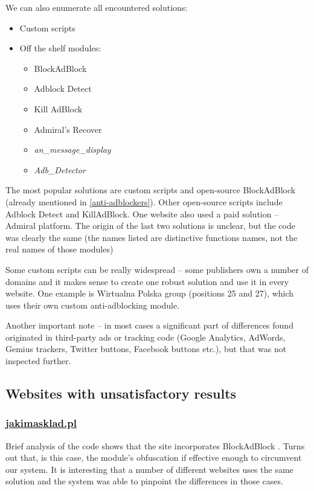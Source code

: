 We can also enumerate all encountered solutions:
\begin{itemize}
  \item Custom scripts
  \item Off the shelf modules:
    \begin{itemize}
      \item BlockAdBlock \cite{github:blockadblock}
      \item Adblock Detect \cite{adblock-detect}
      \item Kill AdBlock \cite{kill-adblock}
      \item Admiral's Recover \cite{admiral:recover}
      \item \emph{an\_message\_display}
      \item \emph{Adb\_Detector}
    \end{itemize}
\end{itemize}

The most popular solutions are custom scripts and open-source BlockAdBlock (already mentioned in \ref{anti-adblockers}).
Other open-source scripts include Adblock Detect and KillAdBlock. One website also used a paid solution -- Admiral platform.
The origin of the last two solutions is unclear, but the code was clearly the same (the names listed are 
distinctive functions names, not the real names of those modules)

Some custom scripts can be really widespread -- some publishers own a number of domains and it makes 
sense to create one robust solution and use it in every website. One example is Wirtualna Polska group (positions 25 and 27), 
which uses their own custom anti-adblocking module.

Another important note -- in most cases a significant part of differences found originated in third-party ads
or tracking code (Google Analytics, AdWords, Gemius trackers, Twitter buttons, Facebook buttons etc.),
but that was not inspected further.


\subsection{Websites with unsatisfactory results}

\subsubsection{\url{jakimasklad.pl}}
Brief analysis of the code shows that the site incorporates BlockAdBlock \cite{github:blockadblock}. 
Turns out that, is this case, the module's obfuscation if effective enough to circumvent our system.
It is interesting that a number of different websites uses the same solution and the system
was able to pinpoint the differences in those cases.

